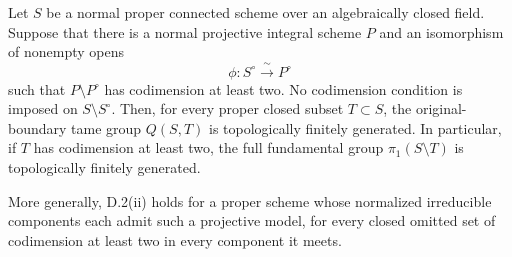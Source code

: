 \begin{proposition}
\label{D:codimension-one-projective-model}
Let $S$ be a normal proper connected scheme over an algebraically closed
field. Suppose that there is a normal projective integral scheme $P$
and an isomorphism of nonempty opens
\[
                  \phi:S^\circ\xrightarrow{\ \sim\ }P^\circ
\]
such that $P\setminus P^\circ$ has codimension at least two.
No codimension condition is imposed on $S\setminus S^\circ$.
Then, for every
proper closed subset $T\subset S$, the original-boundary tame group
$Q(S,T)$ is topologically finitely generated. In particular, if $T$
has codimension at least two, the full fundamental group
$\pi_1(S\setminus T)$ is topologically finitely generated.

More generally, D.2(ii) holds for a proper scheme whose normalized
irreducible components each admit such a projective model, for every
closed omitted set of codimension at least two in every component it
meets.
\end{proposition}

